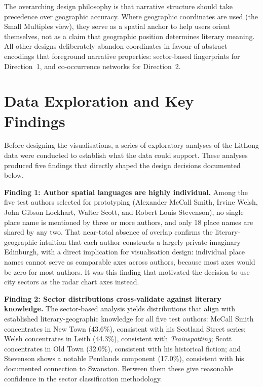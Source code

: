 \documentclass[logo,msc]{infthesis}
\begin{document}
The overarching design philosophy is that narrative structure should take precedence over geographic accuracy. Where geographic coordinates are used (the Small Multiples view), they serve as a spatial anchor to help users orient themselves, not as a claim that geographic position determines literary meaning. All other designs deliberately abandon coordinates in favour of abstract encodings that foreground narrative properties: sector-based fingerprints for Direction~1, and co-occurrence networks for Direction~2.
 
\section{Data Exploration and Key Findings}
\label{sec:dataexploration}
 
Before designing the visualisations, a series of exploratory analyses of the LitLong data were conducted to establish what the data could support. These analyses produced five findings that directly shaped the design decisions documented below.
 
\textbf{Finding 1: Author spatial languages are highly individual.} Among the five test authors selected for prototyping (Alexander McCall Smith, Irvine Welsh, John Gibson Lockhart, Walter Scott, and Robert Louis Stevenson), no single place name is mentioned by three or more authors, and only 18 place names are shared by any two. That near-total absence of overlap confirms the literary-geographic intuition that each author constructs a largely private imaginary Edinburgh, with a direct implication for visualisation design: individual place names cannot serve as comparable axes across authors, because most axes would be zero for most authors. It was this finding that motivated the decision to use city sectors as the radar chart axes instead.
 
\textbf{Finding 2: Sector distributions cross-validate against literary knowledge.} The sector-based analysis yields distributions that align with established literary-geographic knowledge for all five test authors: McCall Smith concentrates in New Town (43.6\%), consistent with his Scotland Street series; Welsh concentrates in Leith (44.3\%), consistent with \textit{Trainspotting}; Scott concentrates in Old Town (32.0\%), consistent with his historical fiction; and Stevenson shows a notable Pentlands component (17.0\%), consistent with his documented connection to Swanston. Between them these give reasonable confidence in the sector classification methodology.
\end{document}
